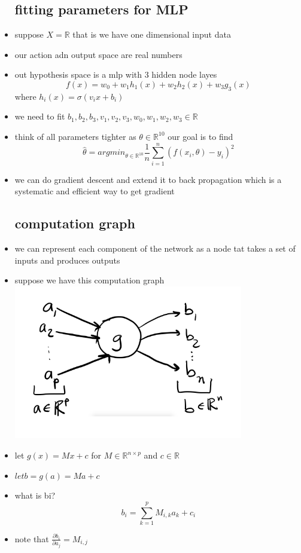 \documentclass{article}
\begin{document}
\begin{itemize}
\subsection*{fitting parameters for MLP}
\item suppose $X=\mathbb{R}$ that is we have one dimensional input data
\item our action adn output space are real numbers
\item out hypothesis space is a mlp with 3 hidden node layes $$f(x)=w_{0}+w_1h_1(x)+w_2h_2(x)+w_3g_3(x)$$ where $h_i(x)=\sigma(v_ix+b_i)$
\item we need to fit $b_1, b_2, b_3, v_1,v_2,v_3, w_0,w_1,w_2,w_3\in \mathbb{R}$
\item think of all parameters tighter as $\theta\in \mathbb{R}^{10}$ our goal is to find $$\hat{\theta}=argmin_{\theta\in \mathbb{R}^{10}}\frac{1}{n}\sum_{i=1}^{n}(f(x_i,\theta)-y_i)^{2}$$
\item we can do gradient descent and extend it to back propagation which is a systematic and efficient way to get gradient  
\subsection*{computation graph}
\item we can represent each component of the network as a node tat takes a set of inputs and produces outputs 
\item suppose we have this computation graph \includegraphics*[width=10cm]{images/Screenshot 2023-05-15 at 12.57.42 AM.png}
\item let $g(x)=Mx+c$ for $M\in \mathbb{R}^{n\times p}$ and $c\in \mathbb{R}$
\item $let b=g(a)=Ma+c$
\item what is bi? $$b_i=\sum_{k=1}^{p}M_{i,k}a_k+c_i$$
\item note that $\frac{\partial b_i}{\partial a_j}=M_{i,j}$

\end{itemize}
\end{document}
